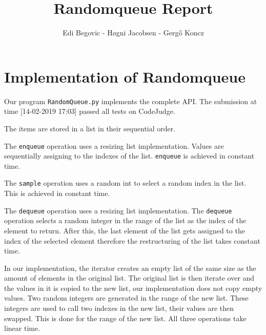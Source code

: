 \documentclass{tufte-handout}
\title{Randomqueue Report}
\author{Edi Begovic - Høgni Jacobsen - Gergő Koncz}
\begin{document}
\maketitle
\thispagestyle{empty}

\section{Implementation of Randomqueue}


Our program \texttt{RandomQueue.py} implements the complete API.
The submission at time [14-02-2019 17:03] passed all tests on CodeJudge.

The items are stored in a list in their sequential order.

The \texttt{enqueue}  operation uses  a resizing list implementation. Values are sequentially assigning to the indexes of the list.
\texttt{enqueue} is achieved in constant time.

The \texttt{sample} operation uses a random int to select a random index in the list. This is achieved in constant time. 

The \texttt{dequeue} operation uses  a resizing list implementation. The \texttt{dequeue} operation selects a random integer in the range of the list as the index of the element to return. After this, the last element of the list gets assigned to the index of the selected element therefore the restructuring of the list takes constant time.

In our implementation, the iterator creates an empty list of the same size as the amount of elements in the original list. The original list is then iterate over and the values in it is copied to the new list, our implementation does not copy empty values. Two random integers are generated in the range of the new list. These integers are used to call two indexes in the new list, their values are then swapped. This is done for the range of the new list. All three operations take linear time. 
\end{document}
